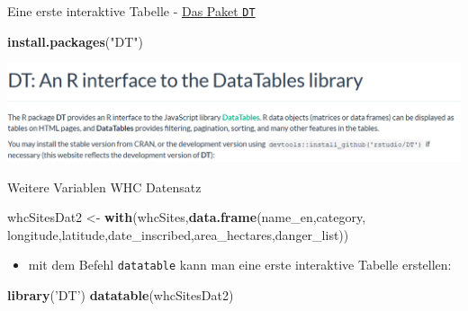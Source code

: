 \documentclass[ignorenonframetext,]{beamer}
\newenvironment{Shaded}{}{}
\newcommand{\KeywordTok}[1]{\textcolor[rgb]{0.00,0.44,0.13}{\textbf{{#1}}}}
\newcommand{\StringTok}[1]{\textcolor[rgb]{0.25,0.44,0.63}{{#1}}}
\newcommand{\NormalTok}[1]{{#1}}
\providecommand{\tightlist}{%
\setlength{\itemsep}{0pt}\setlength{\parskip}{0pt}}
\begin{document}
\begin{frame}[fragile]{Eine erste interaktive Tabelle -
\href{https://rstudio.github.io/DT/}{Das Paket \texttt{DT}}}

\begin{Shaded}
\begin{Highlighting}[]
\KeywordTok{install.packages}\NormalTok{(}\StringTok{"DT"}\NormalTok{)}
\end{Highlighting}
\end{Shaded}

\includegraphics{./tex2pdf.956/7752297de29c10259795463db8e6056992088da7.png}

\end{frame}

\begin{frame}[fragile]{Weitere Variablen WHC Datensatz}

\begin{Shaded}
\begin{Highlighting}[]
\NormalTok{whcSitesDat2 <-}\StringTok{ }\KeywordTok{with}\NormalTok{(whcSites,}\KeywordTok{data.frame}\NormalTok{(name_en,category,}
                                         \NormalTok{longitude,latitude,date_inscribed,area_hectares,danger_list))}
\end{Highlighting}
\end{Shaded}

\begin{itemize}
\tightlist
\item
  mit dem Befehl \texttt{datatable} kann man eine erste interaktive
  Tabelle erstellen:
\end{itemize}

\begin{Shaded}
\begin{Highlighting}[]
\KeywordTok{library}\NormalTok{(}\StringTok{'DT'}\NormalTok{)}
\KeywordTok{datatable}\NormalTok{(whcSitesDat2)}
\end{Highlighting}
\end{Shaded}

\end{frame}
\end{document}
